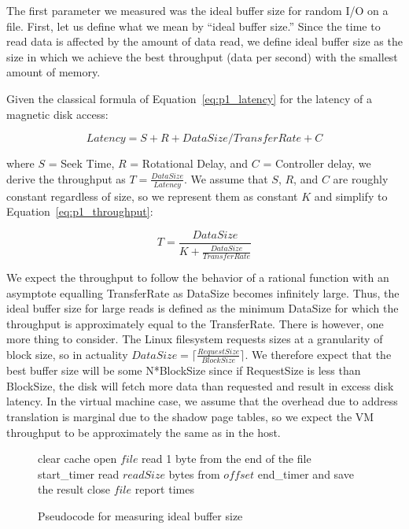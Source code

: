 The first parameter we measured was the ideal buffer size for random I/O 
on a file. First, let us define what we mean by ``ideal buffer size.'' Since
the time to read data is affected by the amount of data read, we define ideal
buffer size as the size in which we achieve the best throughput (data per second)
with the smallest amount of memory. 

Given the classical formula of Equation~\ref{eq:p1_latency} for the latency 
of a magnetic disk access:

\begin{equation}\label{eq:p1_latency}
Latency = S + R + DataSize/TransferRate + C
\end{equation}

where $S$ = Seek Time, $R$ = Rotational Delay, and $C$ = Controller delay, we 
derive the throughput as $T = \frac{DataSize}{Latency}$. We assume that $S$, $R$, 
and $C$ are roughly constant regardless of size, so we represent them as constant 
$K$ and simplify to Equation~\ref{eq:p1_throughput}:

\begin{equation}\label{eq:p1_throughput}
T = \frac{DataSize}{K + \frac{DataSize}{TransferRate}}
\end{equation}

We expect the throughput to follow the behavior of a rational function
with an asymptote equalling TransferRate as DataSize becomes infinitely large.
Thus, the ideal buffer size for large reads is defined as the minimum DataSize for 
which the throughput is approximately equal to the TransferRate. There is however, 
one more thing to consider. The Linux filesystem requests sizes at a granularity of 
block size, so in actuality $DataSize = \lceil\frac{RequestSize}{BlockSize}\rceil$.
We therefore expect that the best buffer size will be some N*BlockSize since
if RequestSize is less than BlockSize, the disk will fetch more data than
requested and result in excess disk latency. In the virtual machine case, we assume 
that the overhead due to address translation is marginal due to the shadow page 
tables, so we expect the VM throughput to be approximately the same as in the host.

\begin{figure}[b]
\begin{algorithmic}
   \STATE clear cache
   \STATE open $file$
   \STATE read 1 byte from the end of the file
   \STATE start\_timer
   \STATE read $readSize$ bytes from $offset$
   \STATE end\_timer and save the result
   \STATE close $file$
   \STATE report times
\ENDFOR
\end{algorithmic}
\caption{Pseudocode for measuring ideal buffer size}
\label{fig:p1code}
\end{figure}


